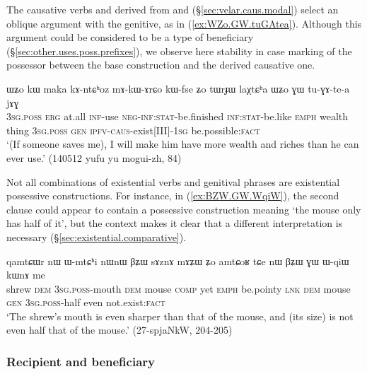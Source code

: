 The causative verbs  and  derived from  and  (§\ref{sec:velar.caus.modal}) select an oblique argument with the genitive, as in (\ref{ex:WZo.GW.tuGAtea}). Although this argument could be considered to be a type of beneficiary (§\ref{sec:other.uses.poss.prefixes}), we observe here stability in case marking of the possessor between the base construction and the derived causative one.

\begin{exe} 
\ex \label{ex:WZo.GW.tuGAtea} 
\gll ɯʑo kɯ maka kɤ-ntɕʰoz mɤ-kɯ-ɤrɕo kɯ-fse ʑo tɯrɟɯ laχtɕʰa ɯʑo ɣɯ tu-ɣɤ-te-a jɤɣ \\ 
\textsc{3sg}.\textsc{poss} \textsc{erg} at.all \textsc{inf}-use \textsc{neg}-\textsc{inf}:\textsc{stat}-be.finished \textsc{inf}:\textsc{stat}-be.like \textsc{emph} wealth thing \textsc{3sg}.\textsc{poss} \textsc{gen} \textsc{ipfv}-\textsc{caus}-exist[III]-\textsc{1sg} be.possible:\textsc{fact} \\ 
\glt `(If someone saves me), I will make him have more wealth and riches than he can ever use.' (140512 yufu yu mogui-zh, 84) 
\end{exe} 

Not all combinations of existential verbs and genitival phrases are existential possessive constructions. For instance, in (\ref{ex:BZW.GW.WqiW}), the second clause could appear to contain a possessive construction meaning `the mouse only has half of it', but the context makes it clear that a different interpretation is necessary (§\ref{sec:existential.comparative}).

\begin{exe}
\ex \label{ex:BZW.GW.WqiW}
\gll qamtɕɯr nɯ ɯ-mtɕʰi nɯnɯ βʑɯ sɤznɤ mɤʑɯ ʑo amtɕoʁ tɕe nɯ βʑɯ ɣɯ ɯ-qiɯ kɯnɤ me \\
shrew \textsc{dem} \textsc{3sg}.\textsc{poss}-mouth \textsc{dem} mouse \textsc{comp} yet \textsc{emph} be.pointy \textsc{lnk} \textsc{dem} mouse \textsc{gen} \textsc{3sg}.\textsc{poss}-half even not.exist:\textsc{fact} \\
\glt `The shrew's mouth is even sharper than that of the mouse, and (its size) is not even half that of the mouse.' (27-spjaNkW, 204-205)
\end{exe}




\subsubsection{Recipient and beneficiary} \label{sec:gen.beneficiary}
 
